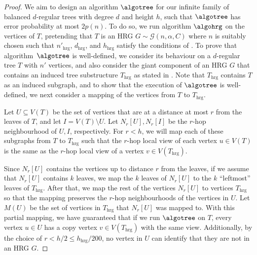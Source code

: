 \documentclass[letterpaper,11pt]{article}
\newcommand{\1}{\mathbb I}
\newcommand{\hrg}{\mathcal{G}(n, \alpha, C)}
\begin{document}
\begin{proof} %
We aim to design an algorithm $\algotree$ for our infinite family of balanced $d$-regular trees with degree $d$ and height $h$, such that $\algotree$ has error probability at most $2p(n)$. 
To do so, we run algorithm $\algohrg$ on the vertices of $T$, pretending that $T$ is an HRG $G\sim\hrg$ where $n$ is suitably chosen such that $n'_{\text{hrg}}$, $d_{\text{hrg}}$, and $h_{\text{hrg}}$ satisfy the conditions of .
To prove that algorithm~$\algotree$ is well-defined, we consider its behaviour on a $d$-regular tree $T$ with $n'$ vertices, and also consider the giant component of an HRG $G$ that contains an induced  tree substructure $T_{\text{hrg}}$ as stated in . Note that $T_{\text{hrg}}$ contains $T$ as an induced subgraph, and to show that the execution of $\algotree$ is well-defined, we next consider a mapping of the vertices from $T$ to $T_{\text{hrg}}$.

Let $U\subseteq V(T)$ be the set of vertices that are at a distance at most $r$ from the leaves of $T$, and let $I=V(T)\setminus U$. Let $N_{r}[U],N_{r}[I]$ be the $r$-hop neighbourhood of $U,I$, respectively. For $r < h$, we will map each of these subgraphs from $T$ to $T_{\text{hrg}}$ such that the $r$-hop local view of each vertex $u\in V(T)$ is the same as the $r$-hop local view of a vertex $v\in V(T_{\text{hrg}})$. 

Since $N_{r}[U]$ contains the vertices up to distance $r$ from the leaves, if we assume that  $N_{r}[U]$ contains $k$ leaves,  we map the $k$ leaves of $N_{r}[U]$ to the $k$ ``leftmost'' leaves of $T_{\text{hrg}}$. After that, we map the rest of the vertices $N_{r}[U]$ to vertices $T_{\text{hrg}}$ so that the mapping preserves the $r$-hop neighbourhoods of the vertices in $U$. Let $M(U)$ be the set of vertices in $T_{\text{hrg}}$ that $N_{r}[U]$ was mapped to. With this partial mapping, we have guaranteed that if we run $\algotree$ on $T$, every vertex $u\in U$ has a copy vertex $v\in V(T_{\text{hrg}})$ with the same view. Additionally, by the choice of $r<h/2\leq h_{\text{hrg}}/200$, no vertex in $U$ can identify that they are not in an HRG $G$.


\end{proof}
\end{document}
